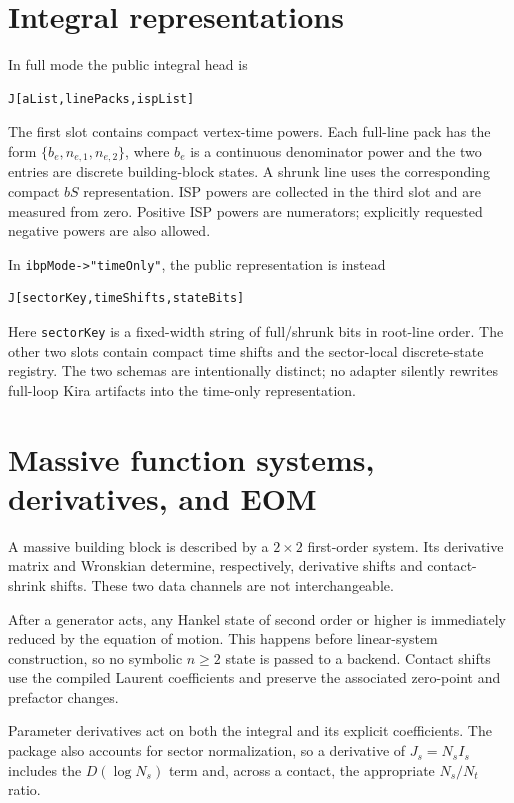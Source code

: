 ﻿\documentclass[a4paper,11pt]{article}
\begin{document}
\section{Integral representations}

In full mode the public integral head is
\begin{verbatim}
J[aList,linePacks,ispList]
\end{verbatim}
The first slot contains compact vertex-time powers. Each full-line pack has the form
$\{b_e,n_{e,1},n_{e,2}\}$, where $b_e$ is a continuous denominator power and the two
entries are discrete building-block states. A shrunk line uses the corresponding compact
$bS$ representation. ISP powers are collected in the third slot and are measured from zero.
Positive ISP powers are numerators; explicitly requested negative powers are also allowed.

In \texttt{ibpMode->"timeOnly"}, the public representation is instead
\begin{verbatim}
J[sectorKey,timeShifts,stateBits]
\end{verbatim}
Here \texttt{sectorKey} is a fixed-width string of full/shrunk bits in root-line order.
The other two slots contain compact time shifts and the sector-local discrete-state registry.
The two schemas are intentionally distinct; no adapter silently rewrites full-loop Kira
artifacts into the time-only representation.

\section{Massive function systems, derivatives, and EOM}

A massive building block is described by a $2\times2$ first-order system. Its derivative
matrix and Wronskian determine, respectively, derivative shifts and contact-shrink shifts.
These two data channels are not interchangeable.

After a generator acts, any Hankel state of second order or higher is immediately reduced
by the equation of motion. This happens before linear-system construction, so no symbolic
$n\geq2$ state is passed to a backend. Contact shifts use the compiled Laurent coefficients
and preserve the associated zero-point and prefactor changes.

Parameter derivatives act on both the integral and its explicit coefficients. The package
also accounts for sector normalization, so a derivative of $J_s=N_s I_s$ includes the
$D(\log N_s)$ term and, across a contact, the appropriate $N_s/N_t$ ratio.
\end{document}
